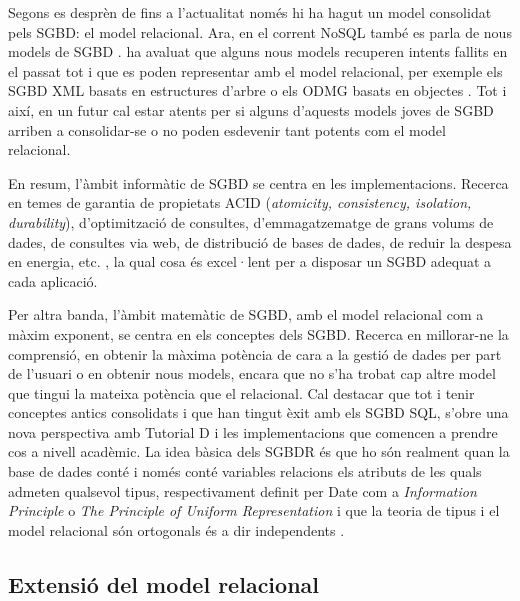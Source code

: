 Segons es desprèn de \textcite{date06} fins a l'actualitat només hi ha hagut un model consolidat pels SGBD: el model relacional. 
Ara, en el corrent NoSQL també es parla de nous models de SGBD \parencite{edlich:nosql,stonebraker09:scidb}.
\citeauthor{date06} ha avaluat que alguns nous models recuperen intents fallits en el passat tot i que es poden representar amb el model relacional, per exemple els SGBD XML basats en estructures d'arbre \parencite[cap.~14]{date06} o els ODMG basats en objectes \parencite[cap.~27]{date06}. Tot i així, en un futur cal estar atents per si alguns d'aquests models joves de SGBD arriben a consolidar-se o no poden esdevenir tant potents com el model relacional.


En resum, l'àmbit informàtic de SGBD se centra en les implementacions. Recerca en temes de garantia de propietats ACID (\emph{atomicity, consistency, isolation, durability}), d'optimització de consultes, d'emmagatzematge de grans volums de dades, de consultes via web, de distribució de bases de dades, de reduir la despesa en energia, etc. \parencite{stonebraker07,stonebraker10}, la qual cosa és excel·lent per a disposar un SGBD adequat a cada aplicació. 

Per altra banda, l'àmbit matemàtic de SGBD, amb el model relacional com a màxim exponent, se centra en els conceptes dels SGBD. Recerca en millorar-ne la comprensió, en obtenir la màxima potència de cara a la gestió de dades per part de l'usuari o en obtenir nous models, encara que  no s'ha trobat cap altre model que tingui la mateixa potència que el relacional. Cal destacar que tot i tenir conceptes antics consolidats i que han tingut èxit amb els SGBD SQL, s'obre una nova perspectiva amb Tutorial D i les implementacions que comencen a prendre cos  a nivell acadèmic. La idea bàsica dels SGBDR és que ho són realment quan la base de dades conté i només conté variables relacions els atributs de les quals admeten qualsevol tipus, respectivament definit per Date com a \emph{Information Principle} o \emph{The Principle of Uniform Representation} \parencite{date:dictionary} i que la teoria de tipus i el model relacional són ortogonals és a dir independents \parencite[cap.~6]{date06}.






\subsection{Extensió del model relacional}



